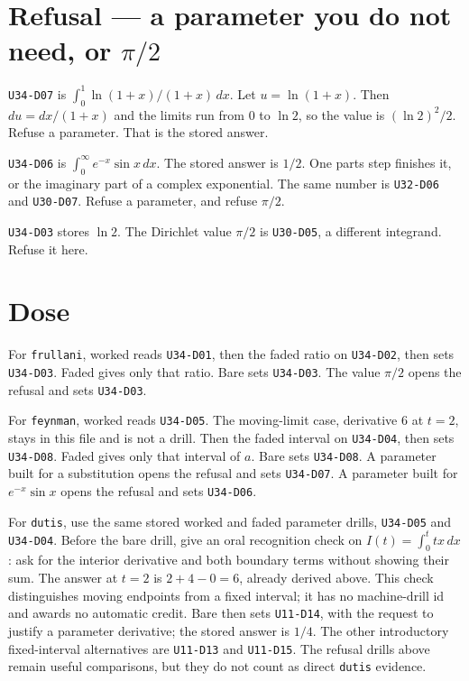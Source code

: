\section{Refusal --- a parameter you do not need, or $\pi/2$}
\texttt{U34-D07} is $\int_0^1 \ln(1+x)/(1+x)\,dx$. Let $u=\ln(1+x)$. Then $du=dx/(1+x)$ and the limits run from 0 to $\ln 2$, so the value is $(\ln 2)^2/2$. Refuse a parameter. That is the stored answer.

\texttt{U34-D06} is $\int_0^\infty e^{-x}\sin x\,dx$. The stored answer is $1/2$. One parts step finishes it, or the imaginary part of a complex exponential. The same number is \texttt{U32-D06} and \texttt{U30-D07}. Refuse a parameter, and refuse $\pi/2$.

\texttt{U34-D03} stores $\ln 2$. The Dirichlet value $\pi/2$ is \texttt{U30-D05}, a different integrand. Refuse it here.

\section{Dose}
For \texttt{frullani}, worked reads \texttt{U34-D01}, then the faded ratio on \texttt{U34-D02}, then sets \texttt{U34-D03}. Faded gives only that ratio. Bare sets \texttt{U34-D03}. The value $\pi/2$ opens the refusal and sets \texttt{U34-D03}.

For \texttt{feynman}, worked reads \texttt{U34-D05}. The moving-limit case, derivative $6$ at $t=2$, stays in this file and is not a drill. Then the faded interval on \texttt{U34-D04}, then sets \texttt{U34-D08}. Faded gives only that interval of $a$. Bare sets \texttt{U34-D08}. A parameter built for a substitution opens the refusal and sets \texttt{U34-D07}. A parameter built for $e^{-x}\sin x$ opens the refusal and sets \texttt{U34-D06}.

For \texttt{dutis}, use the same stored worked and faded parameter drills, \texttt{U34-D05} and \texttt{U34-D04}. Before the bare drill, give an oral recognition check on $I(t)=\int_0^t tx\,dx$: ask for the interior derivative and both boundary terms without showing their sum. The answer at $t=2$ is $2+4-0=6$, already derived above. This check distinguishes moving endpoints from a fixed interval; it has no machine-drill id and awards no automatic credit. Bare then sets \texttt{U11-D14}, with the request to justify a parameter derivative; the stored answer is $1/4$. The other introductory fixed-interval alternatives are \texttt{U11-D13} and \texttt{U11-D15}. The refusal drills above remain useful comparisons, but they do not count as direct \texttt{dutis} evidence.

